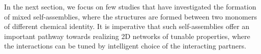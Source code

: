 

In the next section, we focus on few studies that have investigated the formation of mixed self-assemblies, where the structures are formed between two monomers of different chemical identity. It is imperative that such self-assemblies offer an important pathway towards realizing 2D networks of tunable properties, where the interactions can be tuned by intelligent choice of the interacting partners.

